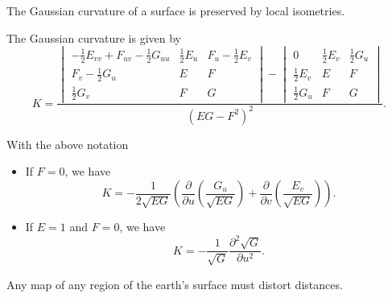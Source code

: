 \begin{theorem}
  The Gaussian curvature of a surface is preserved by local isometries.
\end{theorem}

\begin{corollary}
  The Gaussian curvature is given by
  \[
    K = \frac{
      \begin{vmatrix}
        -\frac{1}{2} E_{vv} + F_{uv} - \frac{1}{2} G_{uu} & \frac{1}{2} E_u & F_u - \frac{1}{2} E_v \\
        F_v - \frac{1}{2} G_u & E & F \\
        \frac{1}{2} G_v & F & G
      \end{vmatrix}
      -
      \begin{vmatrix}
        0 & \frac{1}{2} E_v & \frac{1}{2} G_u \\
        \frac{1}{2} E_v & E & F \\
        \frac{1}{2} G_u & F & G
      \end{vmatrix}
    }{
      (EG - F^2)^2
    }
    .
  \]
\end{corollary}

\begin{corollary}
  With the above notation
  \begin{itemize}
    \item If $F = 0$, we have
    \[
      K = -\frac{1}{2\sqrt{EG}}\left(
        \frac{\partial}{\partial u} \left(\frac{G_u}{\sqrt{EG}}\right)
        + \frac{\partial}{\partial v} \left(\frac{E_v}{\sqrt{EG}}\right)
      \right).
    \]
    \item If $E = 1$ and $F = 0$, we have
    \[
      K = - \frac{1}{\sqrt{G}} \frac{\partial^2 \sqrt{G}}{\partial u^2}.
    \]
  \end{itemize}
\end{corollary}

\begin{proposition}
  Any map of any region of the earth's surface must distort distances.
\end{proposition}